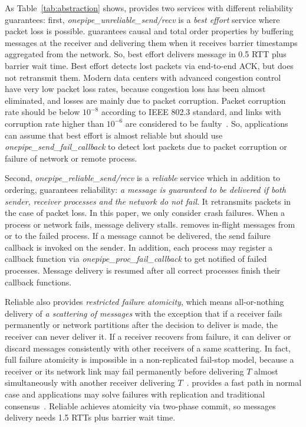 As Table~\ref{tab:abstraction} shows, \sys{} provides two services with different reliability guarantees: first, \textit{onepipe\_unreliable\_send/recv} is a \emph{best effort} service where packet loss is possible. \sys{} guarantees causal and total order properties by buffering messages at the receiver and delivering them when it receives barrier timestamps aggregated from the network. So, best effort \sys{} delivers message in 0.5 RTT plus barrier wait time. %
Best effort \sys{} detects lost packets via end-to-end ACK, but does not retransmit them.
Modern data centers with advanced congestion control~\cite{kumar2020swift,hu2020aeolus,mittal2015timely,zhu2015congestion,gao2015phost} have very low packet loss rates, because congestion loss has been almost eliminated, and losses are mainly due to packet corruption. Packet corruption rate should be below $10^{-8}$ according to IEEE 802.3 standard, and links with corruption rate higher than $10^{-6}$ are considered to be faulty~\cite{zhuo2017understanding}.
So, applications can assume that best effort \sys{} is almost reliable but should use \textit{onepipe\_send\_fail\_callback} to detect lost packets due to packet corruption or failure of network or remote process.

Second, \textit{onepipe\_reliable\_send/recv} is a \emph{reliable} service which in addition to ordering, guarantees reliability: \emph{a message is guaranteed to be delivered if both sender, receiver processes and the network do not fail}.
It retransmits packets in the case of packet loss.
In this paper, we only consider crash failures.
When a process or network fails, message delivery stalls.
\sys{} removes in-flight messages from or to the failed process.
If a message cannot be delivered, the send failure callback is invoked on the sender.
In addition, each process may register a callback function via \textit{onepipe\_proc\_fail\_callback} to get notified of failed processes.
Message delivery is resumed after all correct processes finish their callback functions.

Reliable \sys{} also provides \emph{restricted failure atomicity}, which means all-or-nothing delivery of \emph{a scattering of messages} with the exception that if a receiver fails permanently or network partitions after the decision to deliver is made, the receiver can never deliver it.
If a receiver recovers from failure, it can deliver or discard messages consistently with other receivers of a same scattering.
In fact, full failure atomicity is impossible in a non-replicated fail-stop model, because a receiver or its network link may fail permanently before delivering $T$ almost simultaneously with another receiver delivering $T$~\cite{fischer1985impossibility}.
\sys{} provides a fast path in normal case and applications may solve failures with replication and traditional consensus~\cite{lamport1998part,raft}.
Reliable \sys{} achieves atomicity via two-phase commit, so messages delivery needs 1.5 RTTs plus barrier wait time.

